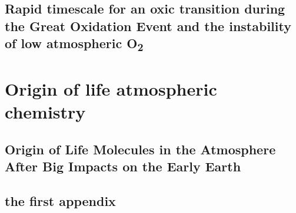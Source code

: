 \documentclass[11pt, proquest]{uwthesis}[2016/11/22]
\begin{document}
\chapter{Rapid timescale for an oxic transition during the Great Oxidation Event and the instability of low atmospheric O\textsubscript{2}}
\newpage


\part{Origin of life atmospheric chemistry}

\chapter{Origin of Life Molecules in the Atmosphere After Big Impacts on the Early Earth}
\newpage


\printendnotes

%
%
\nocite{*}


%
%
\appendix
\raggedbottom\sloppy
 
 
\chapter{the first appendix}
 
\end{document}
